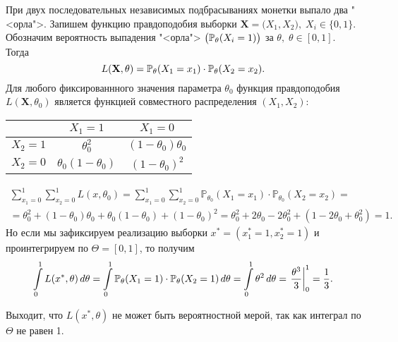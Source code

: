 \begin{exmp}
    При двух последовательных независимых подбрасываниях монетки выпало два "<орла">.
    Запишем функцию правдоподобия выборки $\mathbf{X} = \bigl(X_1, X_2\bigr), \; X_i \in \{0, 1\}$.
    Обозначим вероятность выпадения "<орла"> ${\bigl(\mathbb{P}_{\theta}(X_i = 1)\bigr)}$ за $\theta, \; \theta \in [0, 1]$.
    Тогда
    \begin{equation*}
        L(\mathbf{X}, \theta) = \mathbb{P}_{\theta} (X_1 = x_1) \cdot \mathbb{P}_{\theta} (X_2 = x_2).
    \end{equation*}
    Для любого фиксированнного значения параметра $\theta_0$ функция правдоподобия $L(\mathbf{X}, \theta_0)$ является функцией совместного распределения $(X_1, X_2)$:
    \begin{center}
        \begin{tabular}{|c|c|c|}
            \hline
            & $X_1 = 1$ & $X_1 = 0$ \\
            \hline
            $X_2 = 1$ & $\theta^2_0$ & $(1-\theta_0)\theta_0$ \\
            \hline
            $X_2 = 0$ & $\theta_0(1-\theta_0)$ & $(1-\theta_0)^2$ \\
            \hline
        \end{tabular}
    \end{center}
    \begin{gather*}
        \sum\limits_{x_1 = 0}^{1} \sum\limits_{x_2 = 0}^{1} L(x, \theta_0) = 
        \sum\limits_{x_1 = 0}^{1} \sum\limits_{x_2 = 0}^{1} \mathbb{P}_{\theta_0} (X_1 = x_1) \cdot \mathbb{P}_{\theta_0} (X_2 = x_2) = \\
        = \theta_0^2 + (1 - \theta_0)\theta_0 + \theta_0(1-\theta_0) + (1 - \theta_0)^2 
        = \theta_0^2 + 2\theta_0 - 2\theta_0^2 + (1 - 2\theta_0 + \theta_0^2)
        = 1.
    \end{gather*}
    Но если мы зафиксируем реализацию выборки $x^* = (x_{1}^{*} = 1, x_{2}^{*} = 1)$ и проинтегрируем по $\Theta = [0, 1]$, то получим
    \begin{equation*}
        \int\limits_0^1 L(x^*, \theta) \, d\theta = 
        \int\limits_0^1 \mathbb{P}_{\theta}(X_1 = 1) \cdot \mathbb{P}_{\theta}(X_2 = 1) \, d\theta = 
        \int\limits_0^1 \theta^2 \, d\theta = 
        \left. \frac{\theta^3}{3} \right|_0^1 = 
        \frac{1}{3}.
    \end{equation*}

    Выходит, что $L(x^*, \theta)$ не может быть вероятностной мерой, так как интеграл по $\Theta$ не равен 1.
\end{exmp}

